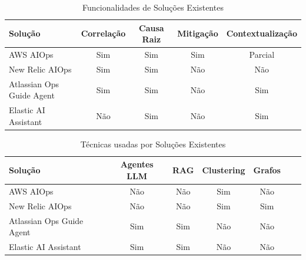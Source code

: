 		\begin{table}[h]
			\centering
			\begin{tabular}{|p{4cm}|c|c|c|c|}
				\hline
				\textbf{Solução} 
				& \textbf{Correlação} 
				& \textbf{Causa Raiz} 
				& \textbf{Mitigação} 
				& \textbf{Contextualização} \\
				\hline
				
				AWS AIOps 
				& Sim 
				& Sim 
				& Sim 
				& Parcial \\
				\hline
				
				New Relic AIOps 
				& Sim 
				& Sim 
				& Não 
				& Não \\
				\hline
				
				Atlassian Ops Guide Agent 
				& Sim 
				& Sim 
				& Não 
				& Sim \\
				\hline
				
				Elastic AI Assistant 
				& Não 
				& Sim 
				& Não 
				& Sim \\
				\hline
			\end{tabular}
			\caption{Funcionalidades de Soluções Existentes}
			\label{tab:aiops_capabilities}
		\end{table}
		
		\begin{table}[h]
			\centering
			\begin{tabular}{|p{4cm}|c|c|c|c|c|c|}
				\hline
				\textbf{Solução} 
				& \textbf{Agentes \gls{LLM}} 
				& \textbf{\gls{RAG}} 
				& \textbf{Clustering} 
				& \textbf{Grafos} \\
				\hline
				
				AWS AIOps 
				& Não 
				& Não 
				& Sim 
				& Não \\
				\hline
				
				New Relic AIOps 
				& Não 
				& Não 
				& Sim 
				& Sim \\
				\hline
				
				Atlassian Ops Guide Agent 
				& Sim 
				& Sim 
				& Não 
				& Não \\
				\hline
				
				Elastic AI Assistant 
				& Sim 
				& Sim 
				& Não 
				& Não \\
				\hline
			\end{tabular}
			\caption{Técnicas usadas por Soluções Existentes}
			\label{tab:aiops_techniques}
		\end{table}
		